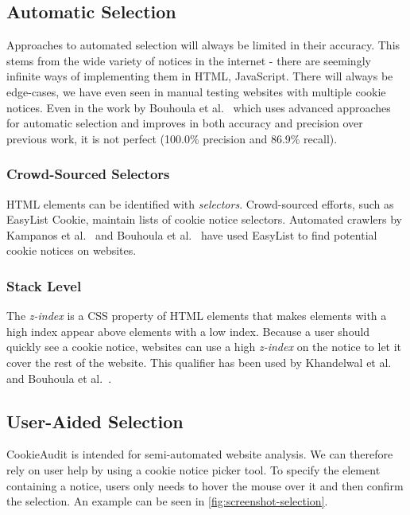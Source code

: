 \subsection{Automatic Selection}

\color{orange}
Approaches to automated selection will always be limited in their accuracy.
This stems from the wide variety of notices in the internet - there are seemingly infinite ways of implementing them in HTML, JavaScript.
There will always be edge-cases, we have even seen in manual testing websites with multiple cookie notices.
Even in the work by Bouhoula et al.~\cite{bouhoula2023automated} which uses advanced approaches for automatic selection and improves in both accuracy and precision over previous work, it is not perfect (100.0\% precision and 86.9\% recall).
\color{black}

\subsubsection{Crowd-Sourced Selectors}
HTML elements can be identified with \emph{selectors}. 
Crowd-sourced efforts, such as EasyList Cookie, maintain lists of cookie notice selectors.
Automated crawlers by Kampanos et al.~\cite{kampanos2021accept} and Bouhoula et al.~\cite{bouhoula2023automated} have used EasyList to find potential cookie notices on websites.

\subsubsection{Stack Level}
The \emph{z-index} is a CSS property of HTML elements that makes elements with a high index appear above elements with a low index. 
Because a user should quickly see a cookie notice, websites can use a high \emph{z-index} on the notice to let it cover the rest of the website. 
This qualifier has been used by Khandelwal et al.~\cite{khandelwal2023automated} and Bouhoula et al.~\cite{bouhoula2023automated}.

\subsection{User-Aided Selection} \label{subsec:user-aided-selection}
CookieAudit is intended for semi-automated website analysis.
We can therefore rely on user help by using a cookie notice picker tool.
To specify the element containing a notice, users only needs to hover the mouse over it and then confirm the selection. 
An example can be seen in \cref{fig:screenshot-selection}.

